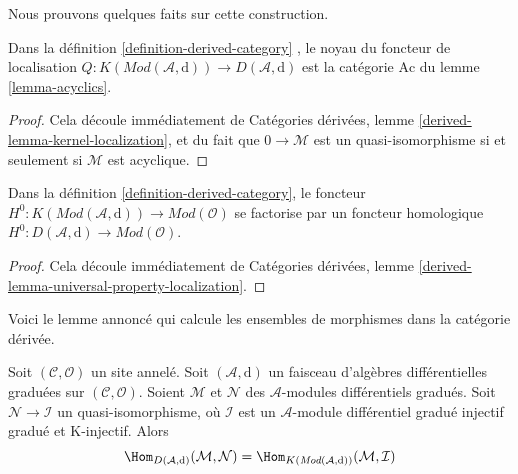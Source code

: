 \noindent
Nous prouvons quelques faits sur cette construction.

\begin{lemma}
\label{lemma-kernel-localization}
Dans la définition \ref{definition-derived-category} , le noyau du foncteur de localisation $Q : K(\textit{Mod}(\mathcal{A}, \text{d})) \to D(\mathcal{A}, \text{d})$ est la catégorie $\text{Ac}$ du lemme \ref{lemma-acyclics}.
\end{lemma}

\begin{proof}
Cela découle immédiatement de Catégories dérivées, lemme \ref{derived-lemma-kernel-localization}, et du fait que $0 \to \mathcal{M}$ est un quasi-isomorphisme si et seulement si $\mathcal{M}$ est acyclique.
\end{proof}

\begin{lemma}
\label{lemma-H0-over-D}
Dans la définition \ref{definition-derived-category}, le foncteur $H^0 : K(\textit{Mod}(\mathcal{A}, \text{d})) \to \textit{Mod}(\mathcal{O})$ se factorise par un foncteur homologique $H^0 : D(\mathcal{A}, \text{d}) \to \textit{Mod}(\mathcal{O})$.
\end{lemma}

\begin{proof}
Cela découle immédiatement de Catégories dérivées, lemme \ref{derived-lemma-universal-property-localization}.
\end{proof}

\noindent
Voici le lemme annoncé qui calcule les ensembles de morphismes dans la catégorie dérivée.

\begin{lemma}
\label{lemma-hom-derived}
Soit $(\mathcal{C}, \mathcal{O})$ un site annelé.
Soit $(\mathcal{A}, \text{d})$ un faisceau d'algèbres différentielles graduées sur $(\mathcal{C}, \mathcal{O})$.
Soient $\mathcal{M}$ et $\mathcal{N}$ des $\mathcal{A}$-modules différentiels gradués.
Soit $\mathcal{N} \to \mathcal{I}$ un quasi-isomorphisme, où $\mathcal{I}$ est un $\mathcal{A}$-module différentiel gradué injectif gradué et K-injectif. Alors
$$
\Hom_{D(\mathcal{A}, \text{d})}(\mathcal{M}, \mathcal{N}) =
\Hom_{K(\textit{Mod}(\mathcal{A}, \text{d}))}(\mathcal{M}, \mathcal{I})
$$
\end{lemma}

